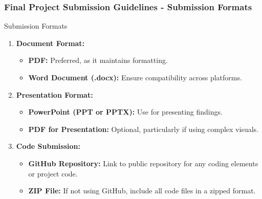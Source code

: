 \documentclass[aspectratio=169]{beamer}
\begin{document}
\begin{frame}[fragile]
    \frametitle{Final Project Submission Guidelines - Submission Formats}
    \begin{block}{Submission Formats}
        \begin{enumerate}
            \item \textbf{Document Format:}
            \begin{itemize}
                \item \textbf{PDF:} Preferred, as it maintains formatting.
                \item \textbf{Word Document (.docx):} Ensure compatibility across platforms.
            \end{itemize}
            
            \item \textbf{Presentation Format:}
            \begin{itemize}
                \item \textbf{PowerPoint (PPT or PPTX):} Use for presenting findings.
                \item \textbf{PDF for Presentation:} Optional, particularly if using complex visuals.
            \end{itemize}
            
            \item \textbf{Code Submission:}
            \begin{itemize}
                \item \textbf{GitHub Repository:} Link to public repository for any coding elements or project code.
                \item \textbf{ZIP File:} If not using GitHub, include all code files in a zipped format.
            \end{itemize}
        \end{enumerate}
    \end{block}
\end{frame}
\end{document}
